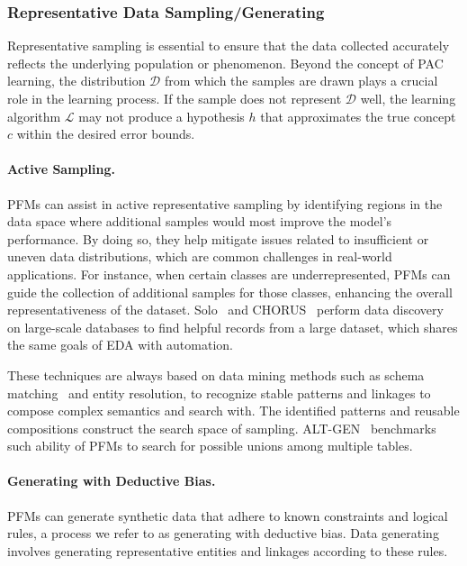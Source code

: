   \subsubsection{Representative Data Sampling/Generating}\label{sec:sample_generating}
  
  Representative sampling is essential to ensure that the data collected accurately reflects the underlying population or phenomenon. Beyond the concept of PAC learning, the distribution $\mathcal{D}$ from which the samples are drawn plays a crucial role in the learning process. If the sample does not represent $\mathcal{D}$ well, the learning algorithm $\mathcal{L}$ may not produce a hypothesis $h$ that approximates the true concept $c$ within the desired error bounds.
  
  \paragraph{Active Sampling.}
  
  PFMs can assist in active representative sampling by identifying regions in the data space where additional samples would most improve the model's performance. By doing so, they help mitigate issues related to insufficient or uneven data distributions, which are common challenges in real-world applications. For instance, when certain classes are underrepresented, PFMs can guide the collection of additional samples for those classes, enhancing the overall representativeness of the dataset. Solo~\cite{Wang2023SoloDD} and CHORUS~\cite{CHORUS} perform data discovery on large-scale databases to find helpful records from a large dataset, which shares the same goals of EDA with automation. 
  
  These techniques are always based on data mining methods such as schema matching~\cite{LLMschema} and entity resolution, to recognize stable patterns and linkages to compose complex semantics and search with. The identified patterns and reusable compositions construct the search space of sampling. ALT-GEN~\cite{tabulargeneration} benchmarks such ability of PFMs to search for possible unions among multiple tables. 
  
  \paragraph{Generating with Deductive Bias.}
  
  PFMs can generate synthetic data that adhere to known constraints and logical rules, a process we refer to as generating with deductive bias. Data generating involves generating representative entities and linkages according to these rules. 
  
